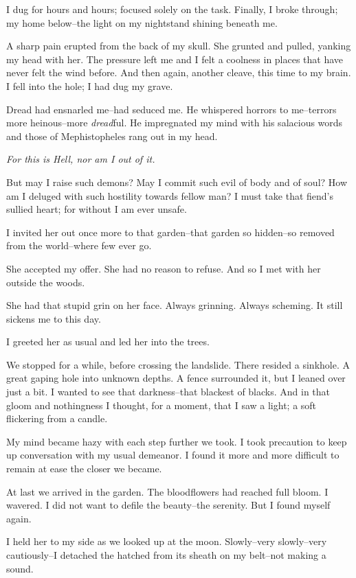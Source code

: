 \documentclass{article}
\begin{document}
I dug for hours and hours; focused solely on the task.
Finally, I broke through; my home below--the
light on my nightstand shining beneath me.


A sharp pain erupted from the back of my skull.
She grunted and pulled, yanking my head with her.
The pressure left me and I felt a coolness in
places that have never felt the wind before.
And then again, another cleave, this time to my brain.
I fell into the hole; I had dug my grave.
\vvvv


\noindent
Dread had ensnarled me--had seduced me.
He whispered horrors to me--terrors
more heinous--more \textit{dread}ful.
He impregnated my mind with his salacious words and
those of Mephistopheles rang out in my head.
\VV


\textit{For this is Hell, nor am I out of it.}
\VV


\noindent
But may I raise such demons?
May I commit such evil of body and of soul?
How am I deluged with such hostility towards fellow man?
I must take that fiend's sullied heart;
for without I am ever unsafe.
\VV


\noindent
I invited her out once more to that garden--that
garden so hidden--so removed from the world--where
few ever go. %


She accepted my offer.
She had no reason to refuse.
And so I met with her outside the woods.


She had that stupid grin on her face.
Always grinning. Always scheming.
It still sickens me to this day.


I greeted her as usual and led her into the trees.


We stopped for a while, before crossing the landslide.
There resided a sinkhole.
A great gaping hole into unknown depths.
A fence surrounded it,
but I leaned over just a bit.
I wanted to see that darkness--that
blackest of blacks.
And in that gloom and nothingness I thought, for a moment,
that I saw a light; a soft flickering from a candle.


My mind became hazy with each step further we took.
I took precaution to keep up conversation with
my usual demeanor.
I found it more and more difficult to remain at ease the closer we became.


At last we arrived in the garden.
The bloodflowers had reached full bloom.
I wavered.  I did not want to defile the beauty--the serenity.
But I found myself again.


I held her to my side as we looked up at the moon.
Slowly--very slowly--very cautiously--I
detached the hatched from its sheath on my belt--not making a sound.
\end{document}

